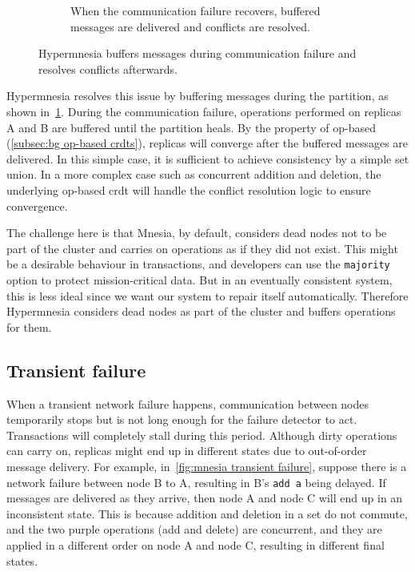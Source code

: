 \begin{figure}[htp]
\begin{subfigure}[t]{0.9\columnwidth}
    \caption{When the communication failure recovers, buffered messages are delivered
    and conflicts are resolved.}
  \end{subfigure}
  \caption{Hypermnesia buffers messages during communication failure and resolves
  conflicts afterwards.}
  \label{fig:hypermnesia comm failure}
\end{figure}


Hypermnesia resolves this issue by buffering messages during the partition, as
shown in~\cref{fig:hypermnesia comm failure}. During the communication failure, 
operations performed on replicas A and B are buffered until the partition heals. 
By the property of op-based  (\cref{subsec:bg op-based crdts}),
replicas will converge after the buffered messages are delivered.
In this simple case, it is sufficient to achieve consistency by a simple set 
union. In a more complex case
such as concurrent addition and deletion, the underlying op-based 
\acrshort{crdt} will handle the conflict resolution 
logic to ensure convergence.

The challenge here is that Mnesia, by default, considers dead nodes not to be 
part of the
cluster and carries on operations as if they did not exist. This might be a
desirable behaviour in transactions, and developers can use the \texttt{majority}
option to protect mission-critical data. But in an eventually consistent system,
this is less ideal since we want our system to repair itself automatically.
Therefore Hypermnesia considers dead nodes as part of the cluster and buffers
operations for them.

\subsection{Transient failure} \label{subsec:impl transient failure}

When a transient network failure happens, communication between nodes temporarily
stops but is not long enough for the failure detector to act. Transactions
will completely stall during this period. Although dirty operations can carry
on, replicas might end up in different states due to out-of-order message delivery.
For example, in~\cref{fig:mnesia transient failure}, suppose there is a
network failure between node B to A, resulting in B's \texttt{add a} being delayed.
If messages are delivered as they arrive, then node A and node C will end up in 
an inconsistent state. This is because addition and deletion in a set 
do not commute, and the two purple operations (add and delete) are concurrent, and
they are applied in a different order on node A and node C, resulting in different final
states.

